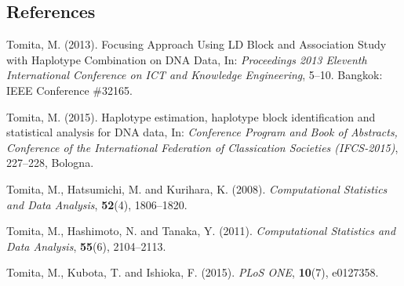 \documentclass[12pt]{article}
\begin{document}
\subsection*{References}

\begin{description}

\item
Tomita, M. (2013).
Focusing Approach Using LD Block and Association Study with Haplotype Combination on DNA Data,
In: \textit{Proceedings 2013 Eleventh International Conference on ICT and Knowledge Engineering}, 5--10.
Bangkok: IEEE Conference \#32165.

\item
Tomita, M. (2015).
Haplotype estimation, haplotype block identification and statistical analysis for DNA data,
In: \textit{Conference Program and Book of Abstracts, Conference of the International Federation of Classication Societies (IFCS-2015)}, 227--228, Bologna.

\item
Tomita, M., Hatsumichi, M. and Kurihara, K. (2008).
\textit{Computational Statistics and Data Analysis},
\textbf{52}(4), 1806--1820.

\item
Tomita, M., Hashimoto, N. and Tanaka, Y. (2011).
\textit{Computational Statistics and Data Analysis},
\textbf{55}(6), 2104--2113.

\item
Tomita, M., Kubota, T. and Ishioka, F. (2015).
\textit{PLoS ONE},
\textbf{10}(7), e0127358.

\end{description}
\end{document}
